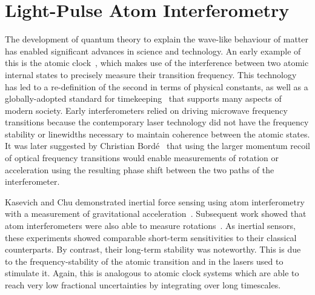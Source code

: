 \section{Light-Pulse Atom Interferometry}
The development of quantum theory to explain the wave-like behaviour
of matter has enabled significant advances in science and technology.
An early example of this is the atomic clock~\cite{ESSEN1955}, which makes use of the
interference between two atomic internal states to precisely measure
their transition frequency. This technology has led to a
re-definition of the second in terms of physical constants, as well as
a globally-adopted standard for timekeeping~\cite{Levine} that supports many aspects
of modern society. Early interferometers relied on driving microwave
frequency transitions because the contemporary laser technology did
not have the frequency stability or linewidths necessary to maintain coherence
between the atomic states. It was later
suggested by Christian Bord\'e~\cite{Borde1989} that using the larger momentum
recoil of optical frequency transitions would enable measurements of
rotation or acceleration using the resulting phase shift between the
two paths of the interferometer.\par\noindent
Kasevich and Chu demonstrated inertial force sensing using atom
interferometry with a measurement of gravitational acceleration~\cite{Kasevich1991,Kasevich1992}. 
Subsequent work showed that atom interferometers were also able to
measure rotations~\cite{Durfee2006}. As inertial sensors, these
experiments showed comparable short-term sensitivities to their
classical counterparts. By contrast, their long-term stability was
noteworthy. This is due to the frequency-stability of the atomic
transition and in the lasers used to stimulate it. Again, this is
analogous to atomic clock systems which are able to reach very low
fractional uncertainties by integrating over long timescales. 
